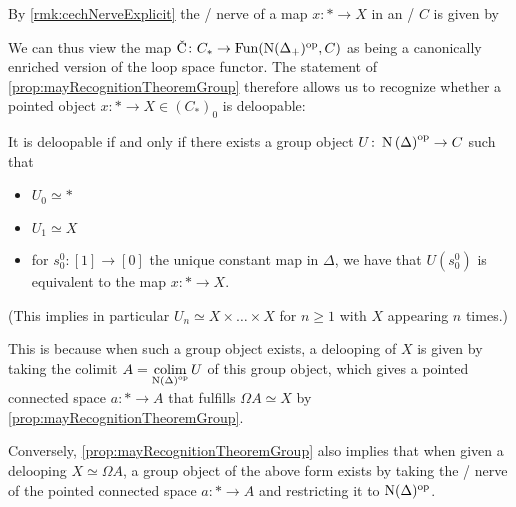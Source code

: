 \begin{remark}
    By \cref{rmk:cechNerveExplicit} the \Cech/ nerve of a map $x\colon*\to X$ in an \inftytop/ $C$ is given by
    \begin{center}
    \end{center}
    We can thus view the map $\CN\colon C_*\to\Fun(\N(\Delta_+)^{\op},C)$ as being a canonically enriched version of the loop space functor.
    The statement of \cref{prop:mayRecognitionTheoremGroup} therefore allows us to recognize whether a pointed object $x\colon*\to X\in\left(C_*\right)_0$ is deloopable:

    It is deloopable if and only if there exists a group object $U\colon\operatorname{N}\left(\Delta\right)^{\operatorname{op}}\to C$ such that 
    \begin{itemize}
        \item $U_0\simeq*$
        \item $U_1\simeq X$
        \item for $s_0^0\colon[1]\to[0]$ the unique constant map in $\Delta$, we have that $U(s_0^0)$ is equivalent to the map $x\colon*\to X$.
    \end{itemize}
    (This implies in particular $U_n\simeq X\times\ldots\times X$ for $n\geq1$ with $X$ appearing $n$ times.)

    This is because when such a group object exists, a delooping of $X$ is given by taking the colimit $A=\operatorname*{colim}\limits_{\operatorname{N}\left(\Delta\right)^{\operatorname{op}}} U$ of this group object, which gives a pointed connected space $a\colon*\to A$ that fulfills $\Omega A\simeq X$ by \cref{prop:mayRecognitionTheoremGroup}.

    Conversely, \cref{prop:mayRecognitionTheoremGroup} also implies that when given a delooping $X\simeq\Omega A$, a group object of the above form exists by taking the \Cech/ nerve of the pointed connected space $a\colon*\to A$ and restricting it to $\operatorname{N}(\Delta)^{\operatorname{op}}$.
\end{remark}
